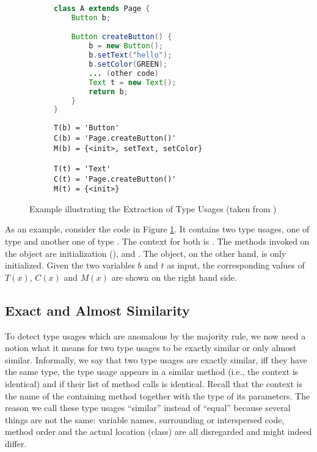 \begin{figure}[h]
    \begin{subfigure}[c]{0.5\textwidth}
        \begin{lstlisting}[language=java, basicstyle=\small]
class A extends Page {
    Button b;

    Button createButton() {
        b = new Button();
        b.setText("hello");
        b.setColor(GREEN);
        ... (other code)
        Text t = new Text();
        return b;
    }
}
        \end{lstlisting}
    \end{subfigure}
    \begin{subfigure}[c]{0.5\textwidth}
        \begin{lstlisting}[basicstyle=\small]
T(b) = 'Button'
C(b) = 'Page.createButton()'
M(b) = {<init>, setText, setColor}

T(t) = 'Text'
C(t) = 'Page.createButton()'
M(t) = {<init>}
        \end{lstlisting}
    \end{subfigure}
    \caption{Example illustrating the Extraction of Type Usages (taken from \cite{monperrus2013detecting})}
    \label{fig:tu_example}
\end{figure}

As an example, consider the code in Figure \ref{fig:tu_example}.
It contains two type usages, one of type  and another one of type .
The context for both is .
The methods invoked on the  object are initialization (),  and .
The  object, on the other hand, is only initialized.
Given the two variables $b$ and $t$ as input, the corresponding values of $T(x)$, $C(x)$ and $M(x)$ are shown on the right hand side.

\subsection{Exact and Almost Similarity}


To detect type usages which are anomalous by the majority rule, we now need a notion what it means for two type usages to be exactly similar or only almost similar.
Informally, we say that two type usages are exactly similar, iff they have the same type, the type usage appears in a similar method (i.e., the context is identical) and if their list of method calls is identical.
Recall that the context is the name of the containing method together with the type of its parameters.
The reason we call these type usages ``similar'' instead of ``equal'' because several things are not the same: variable names, surrounding or interspersed code, method order and the actual location (class) are all disregarded and might indeed differ.

